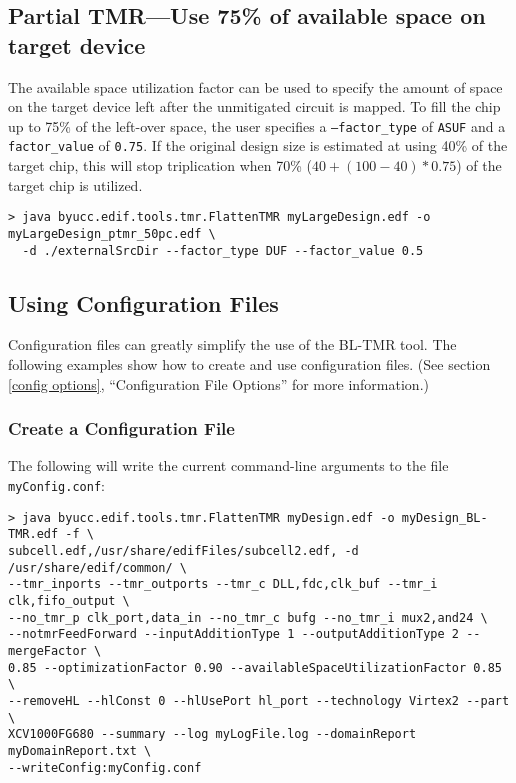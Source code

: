 \documentclass[english]{article}
\begin{document}
\subsection{Partial TMR---Use 75\% of available space on target device}
The available space utilization factor can be used to specify the amount of
space on the target device left after the unmitigated circuit is mapped. To
fill the chip up to 75\% of the left-over space, the user specifies a 
\texttt{--factor\_type} of \texttt{ASUF} and a \texttt{factor\_value} of 
\texttt{0.75}. If the original design size is estimated at using 40\% of the
target chip, this will stop triplication when 70\% ($40 + (100-40)*0.75$) of
the target chip is utilized.

\begin{verbatim}
> java byucc.edif.tools.tmr.FlattenTMR myLargeDesign.edf -o myLargeDesign_ptmr_50pc.edf \
  -d ./externalSrcDir --factor_type DUF --factor_value 0.5
\end{verbatim}


\subsection{Using Configuration Files}
\label{using config}
Configuration files can greatly simplify the use of the BL-TMR tool. The following 
examples show how to create and use configuration files. (See section
\ref{config options}, ``Configuration File Options'' for more information.)

\subsubsection{Create a Configuration File}
The following will write the current command-line arguments to the file
\texttt{myConfig.conf}:

\begin{verbatim}
> java byucc.edif.tools.tmr.FlattenTMR myDesign.edf -o myDesign_BL-TMR.edf -f \ 
subcell.edf,/usr/share/edifFiles/subcell2.edf, -d /usr/share/edif/common/ \ 
--tmr_inports --tmr_outports --tmr_c DLL,fdc,clk_buf --tmr_i clk,fifo_output \ 
--no_tmr_p clk_port,data_in --no_tmr_c bufg --no_tmr_i mux2,and24 \ 
--notmrFeedForward --inputAdditionType 1 --outputAdditionType 2 --mergeFactor \ 
0.85 --optimizationFactor 0.90 --availableSpaceUtilizationFactor 0.85 \
--removeHL --hlConst 0 --hlUsePort hl_port --technology Virtex2 --part \
XCV1000FG680 --summary --log myLogFile.log --domainReport myDomainReport.txt \
--writeConfig:myConfig.conf
\end{verbatim}
\end{document}
